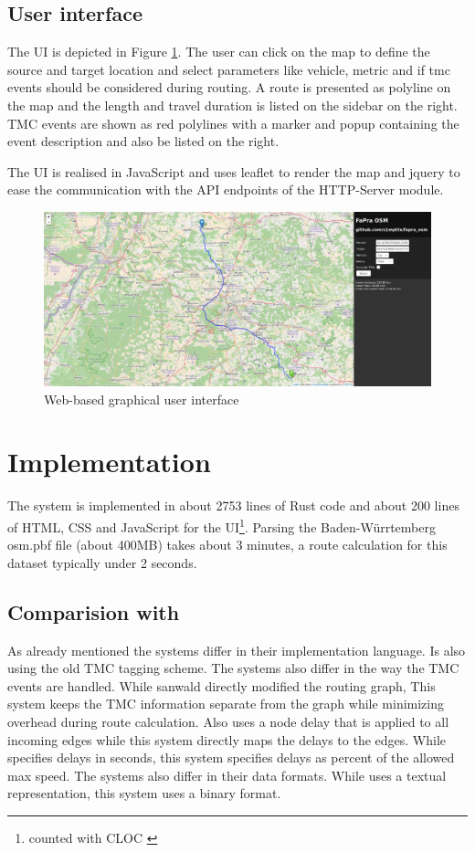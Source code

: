 \documentclass[a4paper]{scrartcl}
\begin{document}
\subsection{User interface}
The UI is depicted in Figure \ref{gui}. The user can click on the map to define the source and target location and select parameters like vehicle, metric and if tmc events should be considered during routing. A route is presented as polyline on the map and the length and travel duration is listed on the sidebar on the right. TMC events are shown as red polylines with a marker and popup containing the event description and also be listed 
on the right. 

The UI is realised in JavaScript and uses leaflet to render the map and jquery to ease the communication with the API endpoints of the HTTP-Server module. 

\begin{figure}[t]
\centering
\includegraphics[width=1.0\textwidth]{img/screenshot.png}
\caption{Web-based graphical user interface}
\label{gui}
\end{figure}


\section{Implementation}
\label{impl}
The system is implemented in about 2753 lines of Rust code and about 200 lines of HTML, CSS and JavaScript for the UI\footnote{counted with CLOC \cite{cloc}}. Parsing the Baden-Würrtemberg osm.pbf file (about 400MB) takes about 3 minutes, a route calculation for this dataset typically under 2 seconds. 

\subsection{Comparision with }
As already mentioned the systems differ in their implementation language. \citeauthor{sanwald2013} Is also using the old TMC tagging scheme. The systems also differ in the way the TMC events are handled. While sanwald directly modified the routing graph, This system keeps the TMC information separate from the graph while minimizing overhead during route calculation. Also \citeauthor{sanwald2013} uses a node delay that is applied to all incoming edges while this system directly maps the delays to the edges. While \citeauthor{sanwald2013} specifies delays in seconds, this system specifies delays as percent of the allowed max speed. The systems also differ in their data formats. While \citeauthor{sanwald2013} uses a textual representation, this system uses a binary format.
\end{document}
